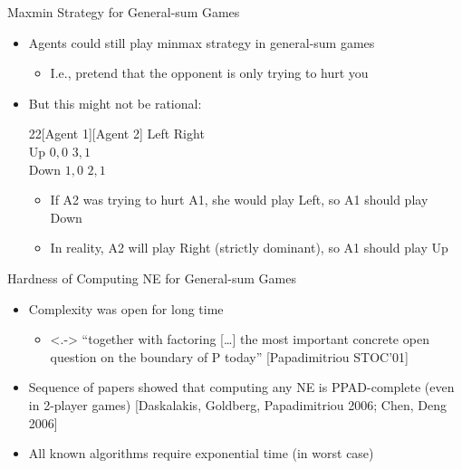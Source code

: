 \documentclass[11pt,aspectratio=169]{beamer}
\begin{document}
  \begin{frame}{Maxmin Strategy for General-sum Games}
   \begin{itemize}
    \item<1-> Agents could still play minmax strategy in general-sum games
    \begin{itemize}
     \item<2-> I.e., pretend that the opponent is only trying to hurt you
    \end{itemize}
    \item<3-> But this might not be rational:
    \begin{center}
    \hspace{-5em}
     \begin{game}{2}{2}[Agent 1][Agent 2]
         \> Left   \> Right  \\
      Up \> $0,0$ \> $3,1$ \\
      Down \> $1,0$ \> $2,1$
     \end{game}
    \end{center}
    \vspace{1 em}
    \begin{itemize}
     \item<5-> If A2 was trying to hurt A1, she would play Left, so A1 should play Down
     \item<6-> In reality, A2 will play Right (strictly dominant), so A1 should play Up
    \end{itemize}
   \end{itemize}
  \end{frame}

  \begin{frame}{Hardness of Computing NE for General-sum Games }
   \begin{itemize}[<+->]
    \item Complexity was open for long time
    \begin{itemize}
     \item<.-> “together with factoring […] the most important concrete open question on
the boundary of P today” {\scriptsize \color[rgb]{0.29, 0.59, 0.9} [Papadimitriou STOC’01]}
    \end{itemize}
    \item Sequence of papers showed that computing any NE is PPAD-complete
(even in 2-player games) {\scriptsize \color[rgb]{0.29, 0.59, 0.9} [Daskalakis, Goldberg, Papadimitriou 2006; Chen, Deng 2006]}
    \item All known algorithms require \alert{exponential time} (in worst case)
   \end{itemize}
  \end{frame}
\end{document}
